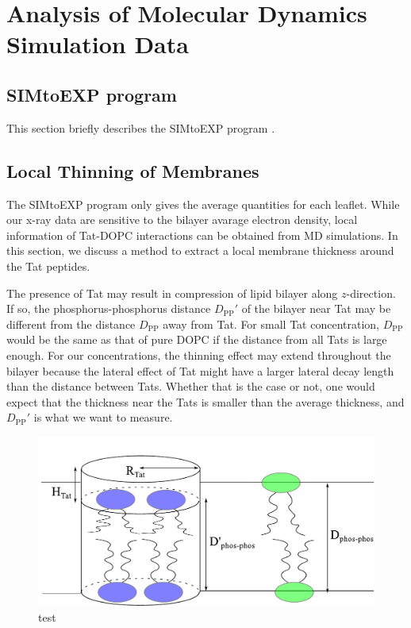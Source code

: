 \newpage
\section{Analysis of Molecular Dynamics Simulation Data}
\subsection{SIMtoEXP program}
This section briefly describes the SIMtoEXP program \cite{ref:Kucerka10}.

\subsection{Local Thinning of Membranes}
The SIMtoEXP program only gives the average quantities for each leaflet. 
While our x-ray data are sensitive to the bilayer avarage electron density,
local information of Tat-DOPC interactions can be obtained from MD simulations.
In this section, we discuss a method to extract a local membrane thickness
around the Tat peptides.

The presence of Tat may result in compression of lipid bilayer along 
$z$-direction. If so, the phosphorus-phosphorus distance $D_\textrm{PP}'$ 
of the bilayer near Tat may be different from the distance
$D_\textrm{PP}$ away from Tat.  
For small Tat concentration, $D_\textrm{PP}$ would be the same as that of 
pure DOPC if the 
distance from all Tats is large enough.  For our concentrations, 
the thinning effect may extend throughout the bilayer because the lateral
effect of Tat might have a larger lateral decay length than the distance 
between Tats. Whether that is the case or not, one would expect that the 
thickness near the Tats is smaller than the average thickness, and
$D_\textrm{PP}'$ is what we want to measure. 
\begin{figure}[htbp]
  \centering
  \includegraphics[scale=0.5]{./figures/Tat/cylinder_model}
  \caption{test}
  \label{fig:cylinder_model}
\end{figure}
 
